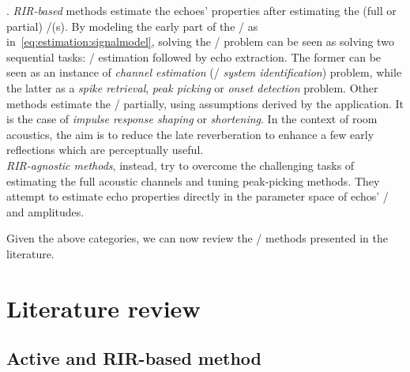 .
\textit{RIR-based} methods estimate the echoes' properties after estimating the (full or partial) \RIR/(s).
By modeling the early part of the \RIR/ as in~\cref{eq:estimation:signalmodel}, solving the \AER/ problem can be seen as solving two sequential tasks: \RIR/ estimation followed by echo extraction.
The former can be seen as an instance of \textit{channel estimation} (\aka/ \textit{system identification}) problem, while the latter as a \textit{spike retrieval}, \textit{peak picking} or \textit{onset detection} problem.
Other methods estimate the \RIRs/ partially, using assumptions derived by the application.
It is the case of \textit{impulse response shaping} or \textit{shortening}.
In the context of room acoustics, the aim is to reduce the late reverberation to enhance a few early reflections which are perceptually useful.
\\\textit{RIR-agnostic methods}, instead, try to overcome the challenging tasks of estimating the full acoustic channels and tuning peak-picking methods.
They attempt to estimate echo properties directly in the parameter space of echos' \TOAs/ and amplitudes.

\begin{figure}[h]
    \footnotesize
    \resizebox{\linewidth}{!}{
        
    }
    \vspace{-\baselineskip}\vspace{-\baselineskip}
\end{figure}

\mynewline
Given the above categories, we can now review the \AER/ methods presented in the literature.

\section{Literature review}\label{sec:estimation:sota}

\subsection{Active and RIR-based method}\label{subsec:estimation:active_rir}

